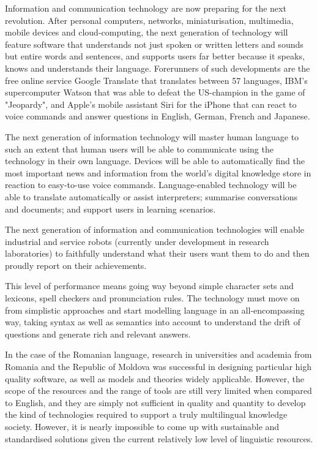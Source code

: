 \begin{multicols}{2}
Information and communication technology are now preparing for the next revolution. After personal computers, networks, miniaturisation, multimedia, mobile devices and cloud-computing, the next generation of technology will feature software that understands not just spoken or written letters and sounds but entire words and sentences, and supports users far better because it speaks, knows and understands their language. Forerunners of such developments are the free online service Google Translate that translates between 57 languages, IBM's supercomputer Watson that was able to defeat the US-champion in the game of "Jeopardy", and Apple's mobile assistant Siri for the iPhone that can react to voice commands and answer questions in English, German, French and Japanese. 

The next generation of information technology will master human language to such an extent that human users will be able to communicate using the technology in their own language. Devices will be able to automatically find the most important news and information from the world's digital knowledge store in reaction to easy-to-use voice commands. Language-enabled technology will be able to translate automatically or assist interpreters; summarise conversations and documents; and support users in learning scenarios. 

The next generation of information and communication technologies will enable industrial and service robots (currently under development in research laboratories) to faithfully understand what their users want them to do and then proudly report on their achievements.  

This level of performance means going way beyond simple character sets and lexicons, spell checkers and pronunciation rules. The technology must move on from simplistic approaches and start modelling language in an all-encompassing way, taking syntax as well as semantics into account to understand the drift of questions and generate rich and relevant answers.

In the case of the Romanian language, research in universities and academia from Romania and the Republic of Moldova was successful in designing particular high quality software, as well as models and theories widely applicable. However, the scope of the resources and the range of tools are still very limited when compared to English, and they are simply not sufficient in quality and quantity to develop the kind of technologies required to support a truly multilingual knowledge society. However, it is nearly impossible to come up with sustainable and standardised solutions given the current relatively low level of linguistic resources. 


\end{multicols}
